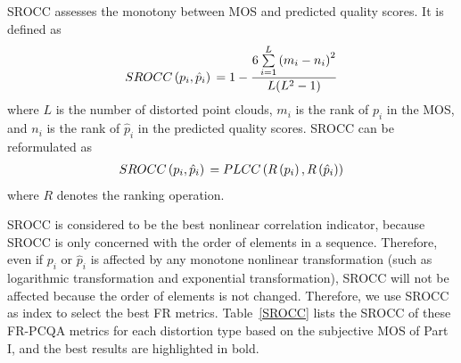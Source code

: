 \documentclass[acmsmall]{acmart}
\begin{document}
\par SROCC assesses the monotony between MOS and predicted quality scores. It is defined as
\begin{align}
SROCC\left( {{p_i},{{\hat p}_i}} \right){\rm{ }} = 1 - \frac{{6\sum\limits_{i = 1}^L {{{({m_i} - {n_i})}^2}} }}{{L({L^2} - 1)}}
\end{align}
where $L$ is the number of distorted point clouds, $m_i$ is the rank of $p_i$ in the MOS, and $n_i$ is the rank of ${\hat p}_i$ in the predicted quality scores. SROCC can be reformulated as
\begin{align}
SROCC\left( {{p_i},{{\hat p}_i}} \right){\rm{ }} = {\rm{ }}PLCC\left( {R\left( {{p_i}} \right),R\left( {{{\hat p}_i}} \right)} \right)
\end{align}
where $R$ denotes the ranking operation.

\par SROCC is considered to be the best nonlinear correlation indicator, because SROCC is only concerned with the order of elements in a sequence. Therefore, even if ${p_i}$ or ${{\hat p}_i}$ is affected by any monotone nonlinear transformation (such as logarithmic transformation and exponential transformation), SROCC will not be affected because the order of elements is not changed. Therefore, we use SROCC as index to select the best FR metrics. Table~\ref{SROCC} lists the SROCC of these FR-PCQA metrics for each distortion type based on the subjective MOS of Part I, and the best results are highlighted in bold.
\end{document}
